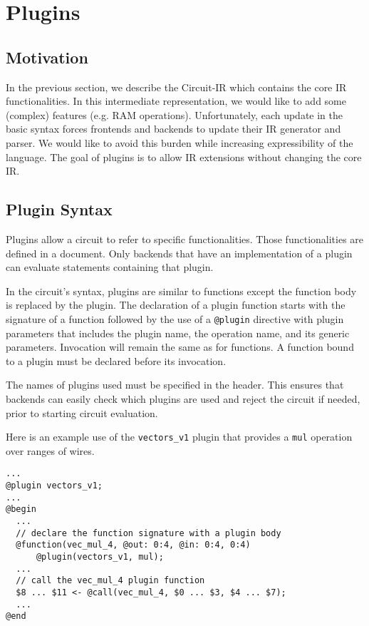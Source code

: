 
\section{Plugins}
\label{sec:plugins}

\subsection{Motivation}

In the previous section, we describe the Circuit-IR which contains the core IR functionalities.
In this intermediate representation, we would like to add some (complex) features (e.g. RAM operations).
Unfortunately, each update in the basic syntax forces frontends and backends to update their IR generator and parser.
We would like to avoid this burden while increasing expressibility of the language.
The goal of plugins is to allow IR extensions without changing the core IR.

\subsection{Plugin Syntax}
Plugins allow a circuit to refer to specific functionalities.
Those functionalities are defined in a document.
Only backends that have an implementation of a plugin can evaluate statements containing that plugin.

In the circuit's syntax, plugins are similar to functions except the function body is replaced by the plugin.
The declaration of a plugin function starts with the signature of a function followed by the use of a \texttt{@plugin} directive with plugin parameters that includes the plugin name, the operation name, and its generic parameters.
Invocation will remain the same as for functions.
A function bound to a plugin must be declared before its invocation.

The names of plugins used %
must be specified in the header. %
This ensures that backends can easily check which plugins are used and reject the circuit if needed, prior to starting circuit evaluation.

 Here is an example use of the \texttt{vectors\_v1} plugin that provides a \texttt{mul} operation over ranges of wires.
\begin{lstlisting}[language=ir]
...
@plugin vectors_v1;
...
@begin
  ...
  // declare the function signature with a plugin body
  @function(vec_mul_4, @out: 0:4, @in: 0:4, 0:4)
      @plugin(vectors_v1, mul);
  ...
  // call the vec_mul_4 plugin function
  $8 ... $11 <- @call(vec_mul_4, $0 ... $3, $4 ... $7);
  ...
@end
\end{lstlisting}

